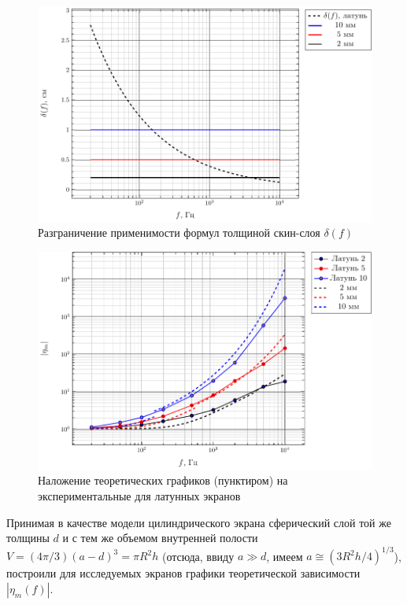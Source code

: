 \documentclass[a4paper,12pt]{article}
\begin{document}
\begin{figure}[H]
	\centering
	\includegraphics[scale=1]{plots/delta}
	\caption{Разграничение применимости формул толщиной скин-слоя $\delta(f)$}
	\label{fig:figure3}

\end{figure}
\begin{figure}[H]
	\centering
	\includegraphics[scale=1]{plots/eta_wt}
	\caption{Наложение теоретических графиков (пунктиром) на экспериментальные для латунных экранов}
	\label{fig:figure3}
\end{figure}
Принимая в качестве модели цилиндрического экрана сферический слой той же толщины $d$ и с тем же объемом внутренней полости $V=(4\pi/3)(a-d)^3=\pi R^2h$ (отсюда, ввиду $a\gg d$, имеем $a\cong (3R^2h/4)^{1/3}$), построили для исследуемых экранов графики теоретической зависимости $|\eta_m(f)|$.
\end{document}
